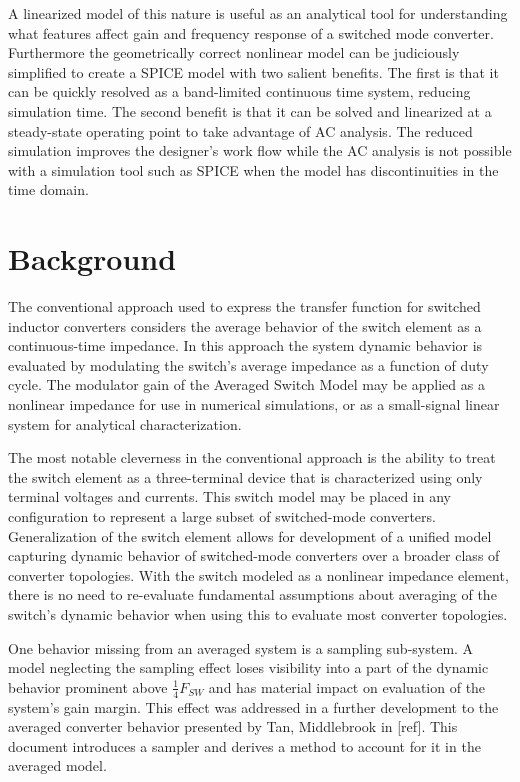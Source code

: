 \documentclass[conference]{IEEEtran}
\begin{document}
A linearized model of this nature is useful as an analytical tool for understanding what features affect gain and frequency response of a switched mode converter.  Furthermore the geometrically correct nonlinear model can be judiciously simplified to create a SPICE model with two salient benefits. The first is that it can be quickly resolved as a band-limited continuous time system, reducing simulation time.  The second benefit is that it can be solved and linearized at a steady-state operating point to take advantage of AC analysis. The reduced simulation improves the designer's work flow while the AC analysis is not possible with a simulation tool such as SPICE when the model has discontinuities in the time domain.

\section{Background}
The conventional approach used to express the transfer function for switched inductor converters considers the average behavior of the switch element as a continuous-time impedance.  In this approach the system dynamic behavior is evaluated by modulating the switch's average impedance as a function of duty cycle. The modulator gain of the Averaged Switch Model may be applied as a nonlinear impedance for use in numerical simulations, or as a small-signal linear system for analytical characterization.

The most notable cleverness in the conventional approach is the ability to treat the switch element as a three-terminal device that is characterized using only terminal voltages and currents. This switch model may be placed in any configuration to represent a large subset of switched-mode converters.  Generalization of the switch element allows for development of a unified model capturing dynamic behavior of switched-mode converters over a broader class of converter topologies. With the switch modeled as a nonlinear impedance element, there is no need to re-evaluate fundamental assumptions about averaging of the switch's dynamic behavior when using this to evaluate most converter topologies.

One behavior missing from an averaged system is a sampling sub-system.  A model neglecting the sampling effect loses visibility into a part of the dynamic behavior prominent above $\frac{1}{4} F_{SW}$ and has material impact on evaluation of the system's gain margin. This effect was addressed in a further development to the averaged converter behavior presented by Tan, Middlebrook in [ref]. This document introduces a sampler and derives a method to account for it in the averaged model.
\end{document}
